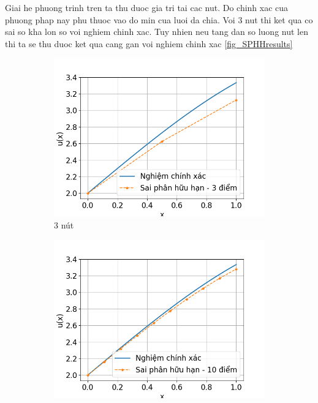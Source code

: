 Giai he phuong trinh tren ta thu duoc gia tri tai cac nut. Do chinh xac cua phuong phap nay phu thuoc vao do min cua luoi da chia. Voi 3 nut thi ket qua co sai so kha lon so voi nghiem chinh xac. Tuy nhien neu tang dan so luong nut len thi ta se thu duoc ket qua cang gan voi nghiem chinh xac \cref{fig_SPHHresults}

\begin{figure}[htbp]
    \centering
    \begin{subfigure}[b]{0.3\linewidth}
        \centering
        \includegraphics[width=\linewidth]{Tuan6/figure/SPHH_3p.png}
        \caption{3 nút}
        \label{fig:SPHH_3p}
    \end{subfigure}\hfill
    \begin{subfigure}[b]{0.3\linewidth}
        \centering
        \includegraphics[width=\linewidth]{Tuan6/figure/SPHH_10p.png}

\end{subfigure}
\end{figure}
